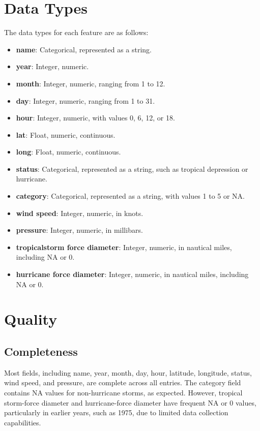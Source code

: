 \section{Data Types}
The data types for each feature are as follows:
\begin{itemize}
	\item \textbf{name}: Categorical, represented as a string.
	\item \textbf{year}: Integer, numeric.
	\item \textbf{month}: Integer, numeric, ranging from 1 to 12.
	\item \textbf{day}: Integer, numeric, ranging from 1 to 31.
	\item \textbf{hour}: Integer, numeric, with values 0, 6, 12, or 18.
	\item \textbf{lat}: Float, numeric, continuous.
	\item \textbf{long}: Float, numeric, continuous.
	\item \textbf{status}: Categorical, represented as a string, such as tropical depression or hurricane.
	\item \textbf{category}: Categorical, represented as a string, with values 1 to 5 or NA.
	\item \textbf{wind speed}: Integer, numeric, in knots.
	\item \textbf{pressure}: Integer, numeric, in millibars.
	\item \textbf{tropicalstorm force diameter}: Integer, numeric, in nautical miles, including NA or 0.
	\item \textbf{hurricane force diameter}: Integer, numeric, in nautical miles, including NA or 0.
\end{itemize}

\section{Quality}
\subsection{Completeness}
Most fields, including name, year, month, day, hour, latitude, longitude, status, wind speed, and pressure, are complete across all entries. The category field contains NA values for non-hurricane storms, as expected. However, tropical storm-force diameter and hurricane-force diameter have frequent NA or 0 values, particularly in earlier years, such as 1975, due to limited data collection capabilities.

